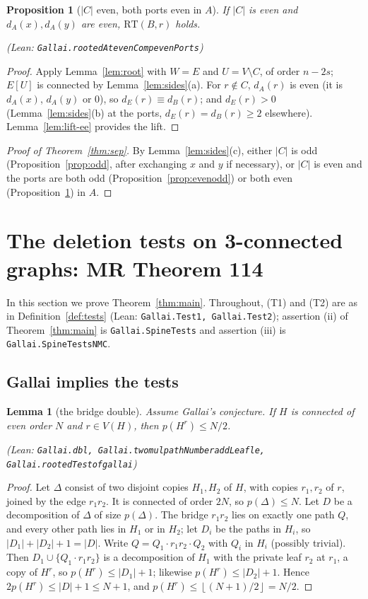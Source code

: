 \documentclass[11pt]{amsart}
\newtheorem{lemma}[theorem]{Lemma}
\newtheorem{proposition}[theorem]{Proposition}
\theoremstyle{definition}
\theoremstyle{remark}
\renewcommand{\_}{\oldunderscore\allowbreak}
\newcommand{\lean}[1]{\textup{(Lean: {\small\texttt{#1}})}}
\newcommand{\leanst}[1]{\par{\raggedright\small\textup{(Lean: \texttt{#1})}\par}}
\newcommand{\fl}[1]{\left\lfloor #1\right\rfloor}
\newcommand{\RT}{\mathrm{RT}}
\begin{document}
\begin{proposition}[$|C|$ even, both ports even in $A$]\label{prop:eveneven}
If $|C|$ is even and $d_A(x),d_A(y)$ are even, $\RT(B,r)$ holds.
\leanst{Gallai.rootedAt\_evenComp\_evenPorts}
\end{proposition}

\begin{proof}
Apply Lemma~\ref{lem:root} with $W=E$ and $U=V\setminus C$, of order $n-2s$; $E[U]$ is connected by
Lemma~\ref{lem:sides}(a). For $r\notin C$, $d_A(r)$ is even (it is $d_A(x)$, $d_A(y)$ or $0$), so
$d_E(r)\equiv d_B(r)$; and $d_E(r)>0$ (Lemma~\ref{lem:sides}(b) at the ports, $d_E(r)=d_B(r)\ge2$
elsewhere). Lemma~\ref{lem:lift-ee} provides the lift.
\end{proof}

\begin{proof}[Proof of Theorem~\ref{thm:sep}]
By Lemma~\ref{lem:sides}(c), either $|C|$ is odd (Proposition~\ref{prop:odd}, after exchanging $x$
and $y$ if necessary), or $|C|$ is even and the ports are both odd (Proposition~\ref{prop:evenodd})
or both even (Proposition~\ref{prop:eveneven}) in $A$.
\end{proof}

\section{The deletion tests on 3-connected graphs: MR Theorem 114}\label{sec:thm114}

In this section we prove Theorem~\ref{thm:main}. Throughout, (T1) and (T2) are as in
Definition~\ref{def:tests} \lean{Gallai.Test1, Gallai.Test2}; assertion (ii) of
Theorem~\ref{thm:main} is \texttt{Gallai.SpineTests} and assertion (iii) is
\texttt{Gallai.SpineTestsNMC}.

\subsection{Gallai implies the tests}

\begin{lemma}[the bridge double]\label{lem:bridge}
Assume Gallai's conjecture. If $H$ is connected of even order $N$ and $r\in V(H)$, then
$p(H^r)\le N/2$.
\leanst{Gallai.dbl, Gallai.two\_mul\_pathNumber\_addLeaf\_le, Gallai.rootedTest\_of\_gallai}
\end{lemma}

\begin{proof}
Let $\Delta$ consist of two disjoint copies $H_1,H_2$ of $H$, with copies $r_1,r_2$ of $r$, joined
by the edge $r_1r_2$. It is connected of order $2N$, so $p(\Delta)\le N$. Let $D$ be a decomposition
of $\Delta$ of size $p(\Delta)$. The bridge $r_1r_2$ lies on exactly one path $Q$, and every other
path lies in $H_1$ or in $H_2$; let $D_i$ be the paths in $H_i$, so $|D_1|+|D_2|+1=|D|$. Write
$Q=Q_1\cdot r_1r_2\cdot Q_2$ with $Q_i$ in $H_i$ (possibly trivial). Then $D_1\cup\{Q_1\cdot
r_1r_2\}$ is a decomposition of $H_1$ with the private leaf $r_2$ at $r_1$, a copy of $H^r$, so
$p(H^r)\le|D_1|+1$; likewise $p(H^r)\le|D_2|+1$. Hence $2p(H^r)\le|D|+1\le N+1$, and
$p(H^r)\le\fl{(N+1)/2}=N/2$.
\end{proof}
\end{document}
